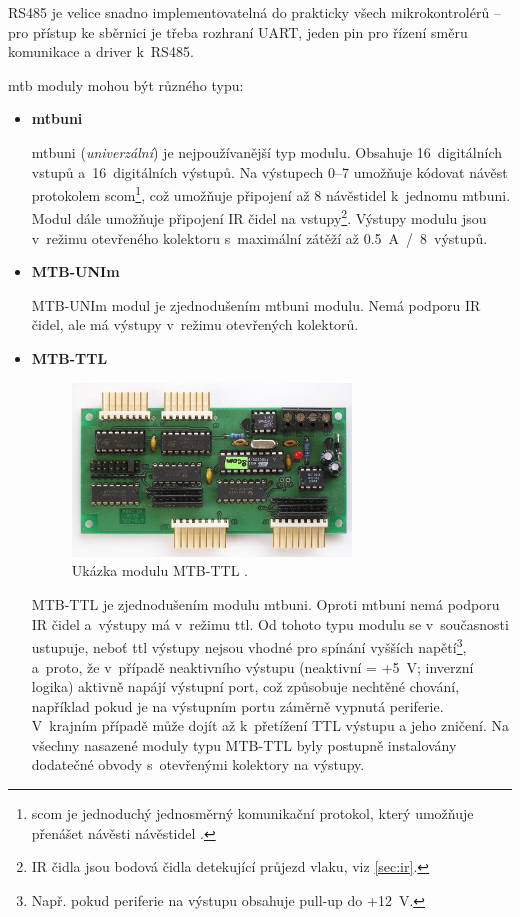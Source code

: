RS485 je velice snadno implementovatelná do prakticky všech mikrokontrolérů –
pro přístup ke sběrnici je třeba rozhraní UART, jeden pin pro řízení směru
komunikace a driver k~RS485.

\gls{mtb} moduly mohou být různého typu:

\begin{itemize}
\item \textbf{\gls{mtbuni}}

	\gls{mtbuni} (\textit{univerzální}) je nejpoužívanější typ modulu. Obsahuje
	16~digitálních vstupů a~16~digitálních výstupů. Na výstupech 0–7 umožňuje
	kódovat návěst protokolem \gls{scom}\footnote{\gls{scom} je jednoduchý jednosměrný
	komunikační protokol, který umožňuje přenášet návěsti návěstidel
	\cite{scom-specs}.}, což umožňuje připojení až 8 návěstidel k~jednomu
	\gls{mtbuni}. Modul dále umožňuje připojení IR čidel na
	vstupy\footnote{IR čidla jsou bodová čidla detekující průjezd vlaku, viz
	\ref{sec:ir}.}. Výstupy modulu jsou v~režimu otevřeného kolektoru
	s~maximální zátěží až 0.5~A~/~8~výstupů.

\item \textbf{MTB-UNIm}

	MTB-UNIm modul je zjednodušením \gls{mtbuni} modulu. Nemá podporu IR čidel,
	ale má výstupy v~režimu otevřených kolektorů.

\item \textbf{MTB-TTL}

	\begin{figure}[ht]
	\includegraphics[width=0.7\textwidth]{data/mtbttl_foto.jpg}
	\caption{Ukázka modulu MTB-TTL \cite{mtb:web}.}
	\label{fig:mtbttl}
	\end{figure}

	MTB-TTL je zjednodušením modulu \gls{mtbuni}. Oproti \gls{mtbuni}
	nemá podporu IR čidel a~výstupy má v~režimu \gls{ttl}. Od tohoto typu
	modulu se v~současnosti ustupuje, neboť \gls{ttl} výstupy nejsou vhodné pro
	spínání vyšších napětí\footnote{Např. pokud periferie na výstupu obsahuje
	pull-up do +12~V.}, a~proto, že v~případě neaktivního výstupu (neaktivní =
	+5~V; inverzní logika) aktivně napájí výstupní port, což způsobuje nechtěné
	chování, například pokud je na výstupním portu záměrně vypnutá periferie.
	V~krajním případě může dojít až k~přetížení TTL výstupu a jeho zničení. Na
	všechny nasazené moduly typu MTB-TTL byly postupně instalovány dodatečné
	obvody s~otevřenými kolektory na výstupy.


\end{itemize}
